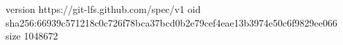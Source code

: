 version https://git-lfs.github.com/spec/v1
oid sha256:66939c571218c0c726f78bca37bcd0b2e79cef4eae13b3974e50c6f9829ee066
size 1048672
